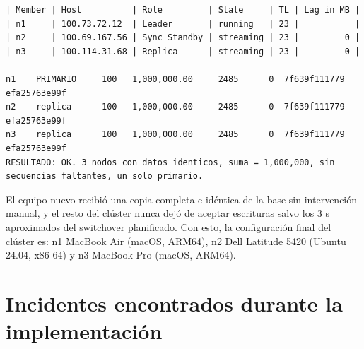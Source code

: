 \documentclass[11pt,a4paper]{article}
\begin{document}
\begin{lstlisting}
| Member | Host          | Role         | State     | TL | Lag in MB |
| n1     | 100.73.72.12  | Leader       | running   | 23 |           |
| n2     | 100.69.167.56 | Sync Standby | streaming | 23 |         0 |
| n3     | 100.114.31.68 | Replica      | streaming | 23 |         0 |

n1    PRIMARIO     100   1,000,000.00     2485      0  7f639f111779 efa25763e99f
n2    replica      100   1,000,000.00     2485      0  7f639f111779 efa25763e99f
n3    replica      100   1,000,000.00     2485      0  7f639f111779 efa25763e99f
RESULTADO: OK. 3 nodos con datos identicos, suma = 1,000,000, sin secuencias faltantes, un solo primario.
\end{lstlisting}

El equipo nuevo recibió una copia completa e idéntica de la base sin intervención manual, y el resto del clúster nunca dejó de aceptar escrituras salvo los 3 s aproximados del switchover planificado. Con esto, la configuración final del clúster es: n1 MacBook Air (macOS, ARM64), n2 Dell Latitude 5420 (Ubuntu 24.04, x86-64) y n3 MacBook Pro (macOS, ARM64).

\section{Incidentes encontrados durante la implementación}
\end{document}
